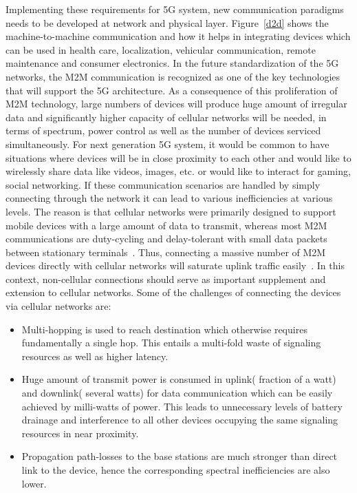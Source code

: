 Implementing these requirements for 5G system, new communication paradigms needs to be developed at network and physical layer. Figure~\ref{d2d} shows the machine-to-machine communication and how it helps in integrating devices which can be used in health care, localization, vehicular communication, remote maintenance and consumer electronics. In the future standardization of the  5G  networks, the M2M communication is  recognized as one of the key technologies that will support the 5G architecture. As a consequence of this proliferation of M2M technology, large numbers of devices will produce huge amount of irregular data and significantly higher capacity of cellular networks will be needed, in terms of spectrum, power control as well as the number of devices serviced simultaneously. For next generation 5G system, it would be common to have situations where devices will be in close proximity to each other and would like to wirelessly share data like videos, images, etc. or would like to interact for gaming, social networking. If these communication scenarios are handled by simply connecting through the network it can lead to various inefficiencies at various levels. The reason is that cellular networks were primarily designed to support mobile devices with a large amount of data to transmit, whereas most M2M  communications are duty-cycling and  delay-tolerant with small data packets between stationary terminals~\cite{laya2014random}. Thus,  connecting a massive  number  of  M2M  devices  directly  with  cellular networks will saturate uplink traffic easily~\cite{chen2014survey}. In this context, non-cellular connections should serve as important supplement and extension to cellular networks. Some of the challenges of connecting the devices via cellular networks are:

\begin{itemize}
\item Multi-hopping is used to reach destination which otherwise requires fundamentally a single hop. This entails a multi-fold waste of signaling resources as well as higher latency.

\item Huge amount of transmit power is consumed in uplink( fraction of a watt) and downlink( several watts) for data communication which can be easily achieved by milli-watts of power. This leads to unnecessary levels of battery drainage and interference to all other devices occupying the same signaling resources in near proximity.

\item Propagation path-losses to the base stations are much stronger than direct link to the device, hence the corresponding spectral inefficiencies are also lower.
\end{itemize}

